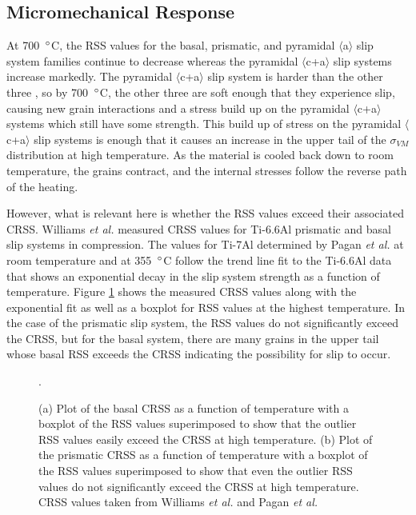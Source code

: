 \documentclass[3p]{elsarticle}
\begin{document}
	

	

\subsection{Micromechanical Response}
	At 700~$\degree$C, the RSS values for the basal, prismatic, and pyramidal $\langle$a$\rangle$ slip system families continue to decrease whereas the pyramidal $\langle$c+a$\rangle$ slip systems increase markedly. The pyramidal $\langle$c+a$\rangle$ slip system is harder than the other three \cite{Williams2002,Pagan2018}, so by 700~$\degree$C, the other three are soft enough that they experience slip, causing new grain interactions and a stress build up on the pyramidal $\langle$c+a$\rangle$ systems which still have some strength. This build up of stress on the pyramidal $\langle$c+a$\rangle$ slip systems is enough that it causes an increase in the upper tail of the $\sigma_{VM}$ distribution at high temperature. As the material is cooled back down to room temperature, the grains contract, and the internal stresses follow the reverse path of the heating. 
		
	However, what is relevant here is whether the RSS values exceed their associated CRSS. Williams \textit{et al.} \cite{Williams2002} measured CRSS values for Ti-6.6Al prismatic and basal slip systems in compression. The values for Ti-7Al determined by Pagan \textit{et al.} \cite{Pagan2018} at room temperature and at 355~$\degree$C follow the trend line fit to the Ti-6.6Al data that shows an exponential decay in the slip system strength as a function of temperature. Figure \ref{fig:CRSS_with_Boxplot} shows the measured CRSS values along with the exponential fit as well as a boxplot for RSS values at the highest temperature.  In the case of the prismatic slip system, the RSS values do not significantly exceed the CRSS, but for the basal system, there are many grains in the upper tail whose basal RSS exceeds the CRSS indicating the possibility for slip to occur. 
	
	\begin{figure}[t!]
		\centering
		\hspace{5pt}
		\caption{(a) Plot of the basal CRSS as a function of temperature with a boxplot of the RSS values superimposed to show that the outlier RSS values easily exceed the CRSS at high temperature. (b) Plot of the prismatic CRSS as a function of temperature with a boxplot of the RSS values superimposed to show that even the outlier RSS values do not significantly exceed the CRSS at high temperature. CRSS values taken from Williams \textit{et al.} \cite{Williams2002} and Pagan \textit{et al.} \cite{Pagan2017, Pagan2018}}.
		\label{fig:CRSS_with_Boxplot}
	\end{figure}
	
\end{document}
